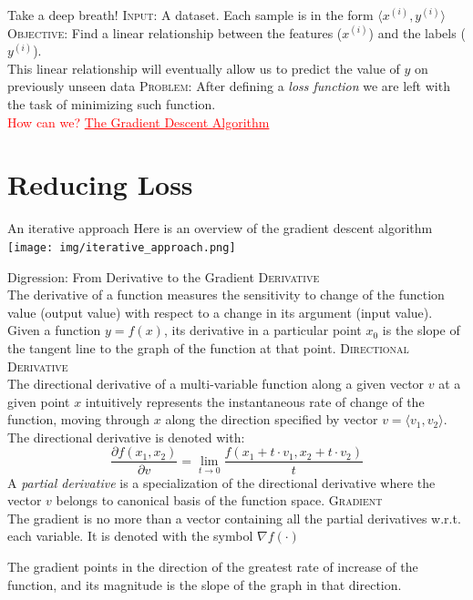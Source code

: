 \documentclass{beamer}
\newcommand{\sample}[2]{#1^{(#2)}}
\begin{document}
\begin{frame}{Take a deep breath!}
\textsc{Input:} A dataset. Each sample is in the form $\langle \sample{x}{i}, \sample{y}{i} \rangle$ \\
\vskip 0.8cm
\textsc{Objective:} Find a linear relationship between the features ($\sample{x}{i}$) and the labels ($\sample{y}{i}$).\\
This linear relationship will eventually allow us to predict the value of $y$ on previously unseen data
\vskip 0.8cm
\textsc{Problem:} After defining a \textit{loss function} we are left with the task of minimizing such function.\\
\vskip 1cm
\pause
\huge
\textcolor{red}{How can we?}
\pause
\textcolor{red}{\underline{The Gradient Descent Algorithm}} 
\end{frame}


\section{Reducing Loss}
\begin{frame}
\tableofcontents[currentsection]
\end{frame}

\begin{frame}[fragile]{An iterative approach}
Here is an overview of the gradient descent algorithm
\vskip 0.8cm
	\centering
	\texttt{[image: img/iterative\_approach.png]}
\end{frame}

\begin{frame}{Digression: From Derivative to the Gradient}
\scriptsize
\textsc{Derivative}\\
The derivative of a function measures the sensitivity to change of the function value (output value) with respect to a change in its argument (input value).\\
Given a function $y=f(x)$, its derivative in a particular point $x_0$ is
the slope of the tangent line to the graph of the function at that point. 
\vskip 0.2cm
\textsc{Directional Derivative}\\
The directional derivative of a multi-variable function
along a given vector $v$ at a given point $x$ intuitively represents the instantaneous rate of change of the function, moving through $x$
along the direction specified by vector $v = \langle v_1, v_2 \rangle$.\\
The directional derivative is denoted with:
\[\frac{\partial f(x_1,x_2)}{\partial v} = \lim_{t \to 0} \frac{f(x_1+t \cdot v_1,x_2+t \cdot v_2)}{t}\] 
A \textit{partial derivative} is a specialization of the directional
derivative where the vector $v$ belongs to canonical basis of the function space.
\vskip 0.2cm
\textsc{Gradient}\\
The gradient is no more than a vector containing all the partial derivatives
w.r.t. each variable. It is denoted with the symbol $\nabla f(\cdot)$
	
The gradient points in the direction of the greatest rate of increase of the function, and its magnitude is the slope of the graph in that direction. 
\end{frame}
\end{document}
